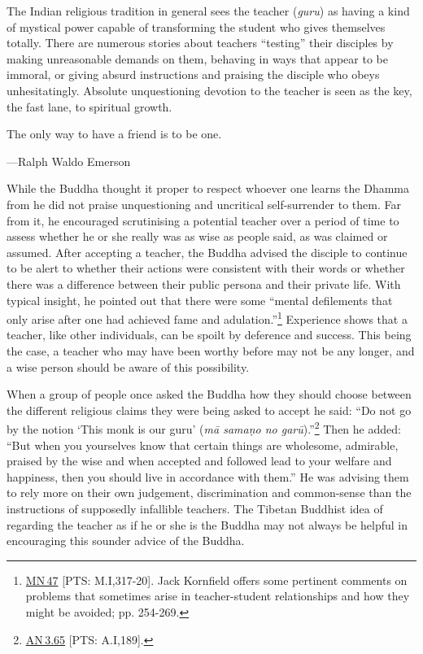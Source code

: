 \documentclass[10pt, openright]{book}
\newenvironment{epigram-2}%
{%
\vspace{1em}
\noindent
\quoting[leftmargin=2.5cm,rightmargin=2.5cm]%
\begin{itshape}
\large
}%
{\end{itshape}\endquoting
}%
\newenvironment{epigram-2-cite}%
{%
\quoting[leftmargin=2.5cm,rightmargin=2.5cm]%
\noindent\normal\hspace*{\fill} 
}%
{\endquoting\vspace{1em}
}%
\begin{document}
The Indian religious tradition in general sees the teacher (\textit{guru}) as having a kind of mystical power capable of transforming the student who gives themselves totally. There are numerous stories about teachers “testing” their disciples by making unreasonable demands on them, behaving in ways that appear to be immoral, or giving absurd instructions and praising the disciple who obeys unhesitatingly. Absolute unquestioning devotion to the teacher is seen as the key, the fast lane, to spiritual growth.


\begin{epigram-2}
The only way to have a friend is to be one.
\end{epigram-2}

\begin{epigram-2-cite}
—Ralph Waldo Emerson
\end{epigram-2-cite}

While the Buddha thought it proper to respect whoever one learns the Dhamma from he did not praise unquestioning and uncritical self-surrender to them. Far from it, he encouraged scrutinising a potential teacher over a period of time to assess whether he or she really was as wise as people said, as was claimed or assumed. After accepting a teacher, the Buddha advised the disciple to continue to be alert to whether their actions were consistent with their words or whether there was a difference between their public persona and their private life. With typical insight, he pointed out that there were some “mental defilements that only arise after one had achieved fame and adulation.”\footnote {\href{https://suttacentral.net/mn47/en/sujato}{MN 47} [PTS: M.I,317-20]. Jack Kornfield offers some pertinent comments on problems that sometimes arise in teacher-student relationships and how they might be avoided; \cite{Kornfield 1993} pp. 254-269.} Experience shows that a teacher, like other individuals, can be spoilt by deference and success. This being the case, a teacher who may have been worthy before may not be any longer, and a wise person should be aware of this possibility.


When a group of people once asked the Buddha how they should choose between the different religious claims they were being asked to accept he said: “Do not go by the notion ‘This monk is our guru’ (\textit{mā samaṇo no garū}).”\footnote {\href{https://suttacentral.net/an3.65/en/sujato}{AN 3.65} [PTS: A.I,189].} Then he added: “But when you yourselves know that certain things are wholesome, admirable, praised by the wise and when accepted and followed lead to your welfare and happiness, then you should live in accordance with them.” He was advising them to rely more on their own judgement, discrimination and common-sense than the instructions of supposedly infallible teachers. The Tibetan Buddhist idea of regarding the teacher as if he or she is the Buddha may not always be helpful in encouraging this sounder advice of the Buddha.
\end{document}
